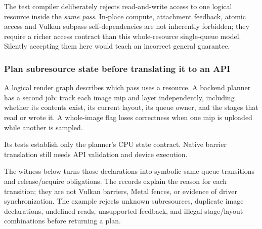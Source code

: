 The test compiler deliberately rejects read-and-write access to one logical resource inside the \emph{same pass}. In-place compute, attachment feedback, atomic access and Vulkan subpass self-dependencies are not inherently forbidden; they require a richer access contract than this whole-resource single-queue model. Silently accepting them here would teach an incorrect general guarantee.

\subsubsection{Plan subresource state before translating it to an API}\label{06-engine-ii-ch042-plan-subresource-state-before-translating-it-to-an-api}

\hypertarget{06-engine-ii-ch042-plan-subresource-state-before-translating-it-to-an-api}{}

A logical render graph describes which pass uses a resource. A backend planner has a second job: track each image mip and layer independently, including whether its contents exist, its current layout, its queue owner, and the stages that read or wrote it. A whole-image flag loses correctness when one mip is uploaded while another is sampled.

Its tests establish only the planner's CPU state contract. Native barrier translation still needs API validation and device execution.

The witness below turns those declarations into symbolic same-queue transitions and release/acquire obligations. The records explain the reason for each transition; they are not Vulkan barriers, Metal fences, or evidence of driver synchronization. The example rejects unknown subresources, duplicate image declarations, undefined reads, unsupported feedback, and illegal stage/layout combinations before returning a plan.

